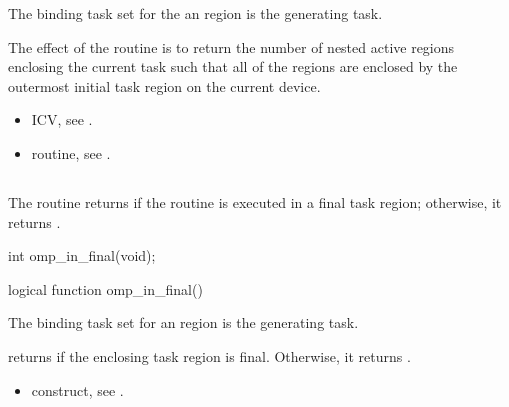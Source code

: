 \binding
The binding task set for the an  region 
is the generating task.

\effect
The effect of the  routine is to return 
the number of nested active  regions enclosing the 
current task such that all of the  regions are 
enclosed by the outermost initial task region on the current device.

\crossreferences
\begin{itemize}
\item {} ICV, see
.

\item {} routine, see
.
\end{itemize}



\subsection{}
\label{subsec:omp_in_final}
\summary
The  routine returns  if the routine 
is executed in a final task region; otherwise, it returns .

\format
\begin{ccppspecific}
\begin{ompcFunction}
int omp_in_final(void);
\end{ompcFunction}
\end{ccppspecific}

\begin{fortranspecific}
\begin{ompfFunction}
logical function omp_in_final()
\end{ompfFunction}
\end{fortranspecific}

\binding
The binding task set for an  region is the generating task.

\effect
{} returns  if the enclosing task region 
is final. Otherwise, it returns .

\crossreferences
\begin{itemize}
\item {} construct, see
.
\end{itemize}



